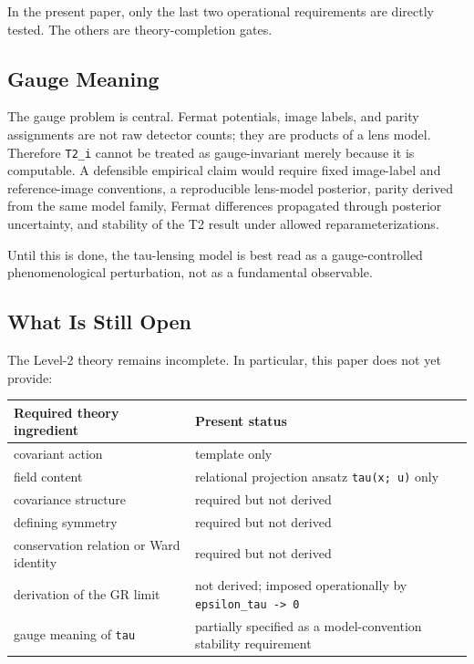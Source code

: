 \documentclass[11pt]{article}
\newcounter{none} %
\begin{document}
In the present paper, only the last two operational requirements are
directly tested. The others are theory-completion gates.

\subsection{Gauge Meaning}\label{gauge-meaning}

The gauge problem is central. Fermat potentials, image labels, and
parity assignments are not raw detector counts; they are products of a
lens model. Therefore \texttt{T2\_i} cannot be treated as
gauge-invariant merely because it is computable. A defensible empirical
claim would require fixed image-label and reference-image conventions, a
reproducible lens-model posterior, parity derived from the same model
family, Fermat differences propagated through posterior uncertainty, and
stability of the T2 result under allowed reparameterizations.

Until this is done, the tau-lensing model is best read as a
gauge-controlled phenomenological perturbation, not as a fundamental
observable.

\subsection{What Is Still Open}\label{what-is-still-open}

The Level-2 theory remains incomplete. In particular, this paper does
not yet provide:

{\def\LTcaptype{none} %
\begin{longtable}[]{@{}
  >{\raggedright\arraybackslash}p{}
  >{\raggedright\arraybackslash}p{}@{}}
\toprule\noalign{}
\begin{minipage}[b]{\linewidth}\raggedright
Required theory ingredient
\end{minipage} & \begin{minipage}[b]{\linewidth}\raggedright
Present status
\end{minipage} \\
\midrule\noalign{}
\endhead
\bottomrule\noalign{}
\endlastfoot
covariant action & template only \\
field content & relational projection ansatz \texttt{tau(x;\ u)} only \\
covariance structure & required but not derived \\
defining symmetry & required but not derived \\
conservation relation or Ward identity & required but not derived \\
derivation of the GR limit & not derived; imposed operationally by
\texttt{epsilon\_tau\ -\textgreater{}\ 0} \\
gauge meaning of \texttt{tau} & partially specified as a
model-convention stability requirement \\
\end{longtable}
}
\end{document}
